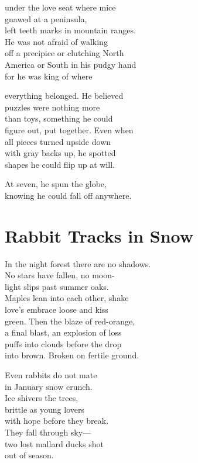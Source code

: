 \documentclass[twoside,10pt]{book}
\begin{document}
under the love seat where mice\\
gnawed at a peninsula,\\
left teeth marks in mountain ranges.\\
He was not afraid of walking\\
off a precipice or clutching North\\
America or South in his pudgy hand\\
for he was king of where

everything belonged. He believed\\
puzzles were nothing more\\
than toys, something he could\\
figure out, put together. Even when\\
all pieces turned upside down\\
with gray backs up, he spotted\\
shapes he could flip up at will.

At seven, he spun the globe,\\
knowing he could fall off anywhere.


\clearpage
\section{Rabbit Tracks in Snow}

In the night forest there are no shadows.\\
No stars have fallen, no moon-\\
light slips past summer oaks.\\
Maples lean into each other, shake\\
love's embrace loose and kiss\\
green. Then the blaze of red-orange,\\
a final blast, an explosion of loss\\
puffs into clouds before the drop\\
into brown. Broken on fertile ground.

Even rabbits do not mate\\
in January snow crunch.\\
Ice shivers the trees,\\
brittle as young lovers\\
with hope before they break.\\
They fall through sky---\\
two lost mallard ducks shot\\
out of season.
\end{document}
